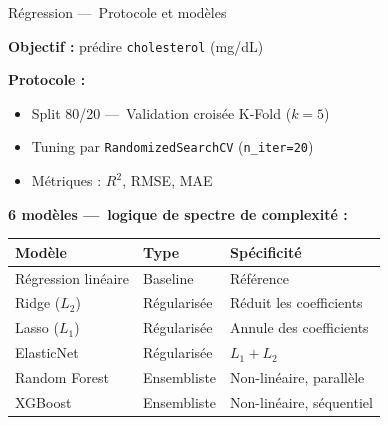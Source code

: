 \documentclass[12pt]{beamer}
\begin{document}
\begin{frame}{Régression ---~Protocole et modèles}

\textbf{Objectif :} prédire \texttt{cholesterol} (mg/dL)

\medskip

\textbf{Protocole :}
\begin{itemize}
  \item Split 80/20 ---~Validation croisée K-Fold ($k=5$)
  \item Tuning par \texttt{RandomizedSearchCV} (\texttt{n\_iter=20})
  \item Métriques : $R^2$, RMSE, MAE
\end{itemize}

\medskip

\textbf{6 modèles ---~logique de spectre de complexité :}

\smallskip
\begin{tabular}{lll}
\toprule
Modèle & Type & Spécificité \\
\midrule
Régression linéaire & Baseline & Référence \\
Ridge ($L_2$) & Régularisée & Réduit les coefficients \\
Lasso ($L_1$) & Régularisée & Annule des coefficients \\
ElasticNet & Régularisée & $L_1 + L_2$ \\
Random Forest & Ensembliste & Non-linéaire, parallèle \\
XGBoost & Ensembliste & Non-linéaire, séquentiel \\
\bottomrule
\end{tabular}

\end{frame}
\end{document}

